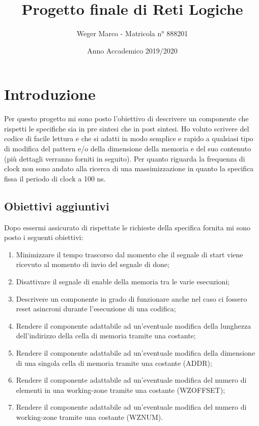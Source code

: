 \documentclass{article}
\begin{document}
\title{Progetto finale di Reti Logiche}
\author{Weger Marco - Matricola n° 888201}
\date{Anno Accademico 2019/2020}
\maketitle

\tableofcontents

\newpage
{}
\section{Introduzione}
Per questo progetto mi sono posto l'obiettivo di descrivere un componente che rispetti le specifiche sia in pre sintesi che in post sintesi.
Ho voluto scrivere del codice di facile lettura e che si adatti in modo semplice e rapido a qualsiasi tipo di modifica del pattern e/o della dimensione della memoria e del suo contenuto (più dettagli verranno forniti in seguito).
Per quanto riguarda la frequenza di clock non sono andato alla ricerca di una massimizzazione in quanto la specifica fissa il periodo di clock a 100 ns.
\subsection{Obiettivi aggiuntivi}
Dopo essermi assicurato di rispettate le richieste della specifica fornita mi sono posto i seguenti obiettivi:
\begin{enumerate}
	\item Minimizzare il tempo trascorso dal momento che il segnale di start viene ricevuto al momento di invio del segnale di done;
	\item Disattivare il segnale di enable della memoria tra le varie esecuzioni;
	\item Descrivere un componente in grado di funzionare anche nel caso ci fossero reset asincroni durante l'esecuzione di una codifica;
	\item Rendere il componente adattabile ad un'eventuale modifica della lunghezza dell'indirizzo della cella di memoria tramite una costante;
	\item Rendere il componente adattabile ad un'eventuale modifica della dimensione di una singola cella di memoria tramite una costante (ADDR);
	\item Rendere il componente adattabile ad un'eventuale modifica del numero di elementi in una working-zone tramite una costante (WZ\textunderscore OFFSET);
	\item Rendere il componente adattabile ad un'eventuale modifica del numero di working-zone tramite una costante (WZ\textunderscore NUM).
\end{enumerate}
\end{document}
